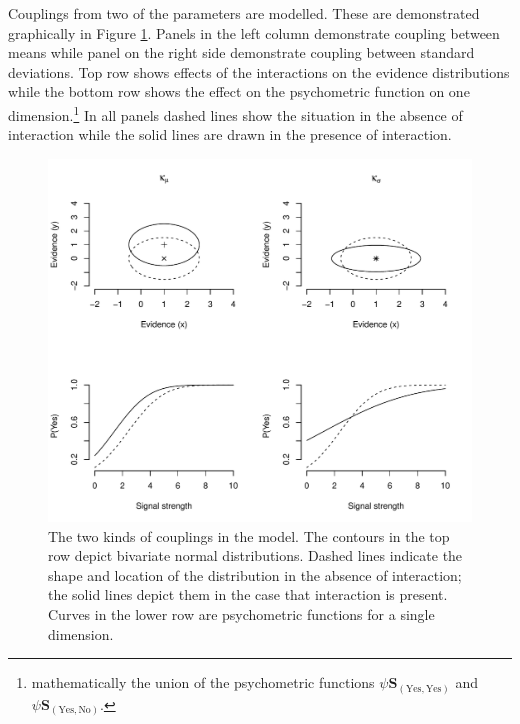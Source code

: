 \documentclass{article}\usepackage{knitr}
\begin{document}
Couplings from two of the parameters are modelled. These are demonstrated graphically  in Figure \ref{fig:grt_couplings}. Panels in the left column demonstrate coupling between means while panel on the right side demonstrate coupling between standard deviations. Top row shows effects of the interactions on the evidence distributions while the bottom row shows the effect on the psychometric function on one dimension.\footnote{mathematically the union of the psychometric functions $\psi{\bm{S}}_{(\text{Yes}, \text{Yes})}$ and $\psi{\bm{S}}_{(\text{Yes}, \text{No})}$.} In all panels dashed lines show the situation in the absence of interaction while the solid lines are drawn in the presence of interaction. 

\begin{figure}
\begin{center}
\begin{knitrout}
\color{fgcolor}
\includegraphics[width=\maxwidth]{figure/unnamed-chunk-10-1} 

\end{knitrout}
\end{center}
\caption{The two kinds of couplings in the model. The contours in the top row depict bivariate normal distributions. Dashed lines indicate the shape and location of the distribution in the absence of interaction; the solid lines depict them in the case that interaction is present. Curves in the lower row are psychometric functions for a single dimension.}
\label{fig:grt_couplings}
\end{figure}
\end{document}
